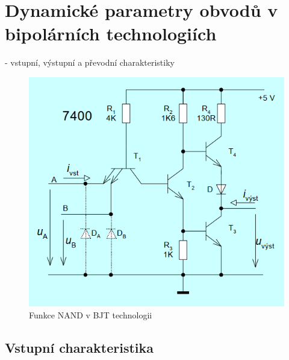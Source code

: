 \section{Dynamické parametry obvodů v bipolárních technologiích}
- vstupní, výstupní a převodní charakteristiky

   \begin{figure}[h]
   \begin{center}
     \includegraphics[scale=0.6]{images/NANDBJT.png}
   \end{center}
   \caption{Funkce NAND v BJT technologii}
  \end{figure}
 \subsection{Vstupní charakteristika}
 

